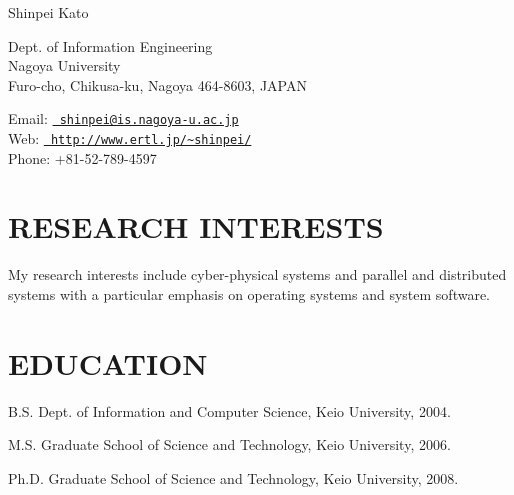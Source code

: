 \documentclass[10pt,letterpaper]{article}
\def\name{Shinpei Kato}
\renewenvironment{itemize}{
  \begin{list}{}{
    \setlength{\leftmargin}{1.5em}
    \setlength{\itemsep}{0.25em}
    \setlength{\parskip}{0pt}
    \setlength{\parsep}{0.25em}
  }
}{
  \end{list}
}
\begin{document}
{\huge \name}


\vspace{0.25in}

\begin{minipage}[t]{0.5\textwidth}
  Dept. of Information Engineering\\
  Nagoya University\\
  Furo-cho, Chikusa-ku, Nagoya 464-8603, JAPAN\\
\end{minipage}
\hspace{1em}
\begin{minipage}[t]{0.5\textwidth}
  Email: \href{mailto:shinpei@is.nagoya-u.ac.jp}{\tt
 shinpei@is.nagoya-u.ac.jp} \\
  Web: \href{http://www.ertl.jp/~shinpei/}{\tt
 http://www.ertl.jp/\~{}shinpei/} \\
  Phone: +81-52-789-4597 \\
\end{minipage}

\section*{RESEARCH INTERESTS}

\begin{itemize}

 \item My research interests include cyber-physical systems and parallel
       and distributed systems with a particular emphasis on operating
       systems and system software.
\end{itemize}

\section*{EDUCATION}

\begin{itemize}

  \item B.S. Dept. of Information and Computer Science, Keio
	University, 2004.

  \item M.S. Graduate School of Science and Technology, Keio
	University, 2006.

  \item Ph.D. Graduate School of Science and Technology, Keio
	University, 2008.\\
\end{itemize}
\end{document}
